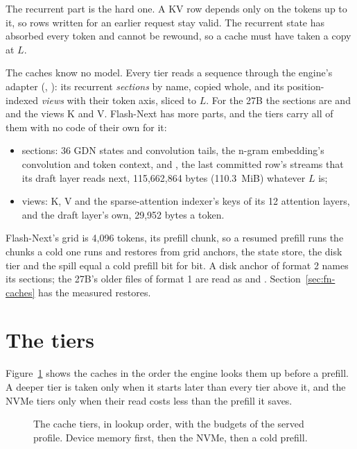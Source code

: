 The recurrent part is the hard one. A KV row depends only on the tokens up to it, so rows written for an earlier request stay valid. The recurrent state has absorbed every token and cannot be rewound, so a cache must have taken a copy at $L$.

The caches know no model. Every tier reads a sequence through the engine's adapter (, ): its recurrent \emph{sections} by name, copied whole, and its position-indexed \emph{views} with their token axis, sliced to $L$. For the 27B the sections are  and  and the views K and V. Flash-Next has more parts, and the tiers carry all of them with no code of their own for it:

\begin{itemize}
\item sections: 36 GDN states and convolution tails, the n-gram embedding's convolution and token context, and , the last committed row's streams that its draft layer reads next, 115,662,864 bytes (110.3~MiB) whatever $L$ is;
\item views: K, V and the sparse-attention indexer's keys of its 12 attention layers, and the draft layer's own, 29,952 bytes a token.
\end{itemize}

Flash-Next's grid is 4,096 tokens, its prefill chunk, so a resumed prefill runs the chunks a cold one runs and restores from grid anchors, the state store, the disk tier and the spill equal a cold prefill bit for bit. A disk anchor of format 2 names its sections; the 27B's older files of format 1 are read as  and . Section~\ref{sec:fn-caches} has the measured restores.

\section{The tiers}

Figure~\ref{fig:cache-tiers} shows the caches in the order the engine looks them up before a prefill. A deeper tier is taken only when it starts later than every tier above it, and the NVMe tiers only when their read costs less than the prefill it saves.

\begin{figure}[htbp]
\centering

\caption[The cache tiers]{The cache tiers, in lookup order, with the budgets of the served profile. Device memory first, then the NVMe, then a cold prefill.}\label{fig:cache-tiers}
\end{figure}

